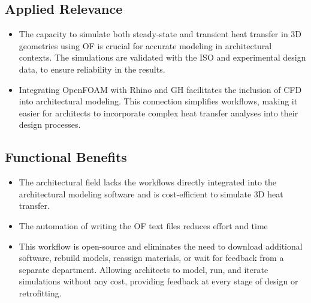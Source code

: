 \subsection{Applied Relevance}
\begin{itemize}
    \item The capacity to simulate both steady-state and transient heat transfer in \gls{3D} geometries using \gls{OF} is crucial for accurate modeling in architectural contexts. The simulations are validated with the \gls{ISO} and experimental design data, to ensure reliability in the results.
    \item Integrating OpenFOAM with \gls{Rhino} and \gls{GH} facilitates the inclusion of \gls{CFD} into architectural modeling. This connection simplifies workflows, making it easier for architects to incorporate complex heat transfer analyses into their design processes.
\end{itemize}

\subsection{Functional Benefits}
\begin{itemize}
    \item The architectural field lacks the workflows directly integrated into the architectural modeling software and is cost-efficient to simulate \gls{3D} heat transfer.
    \item The automation of writing the OF text files reduces effort and time
    \item This workflow is open-source and eliminates the need to download additional software, rebuild models, reassign materials, or wait for feedback from a separate department. Allowing architects to model, run, and iterate simulations without any cost, providing feedback at every stage of design or retrofitting.

\end{itemize}

